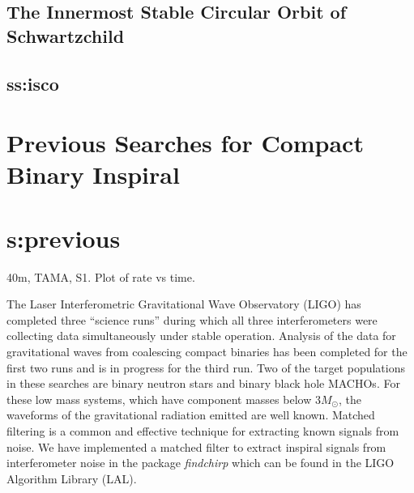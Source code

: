 \subsection{The Innermost Stable Circular Orbit of Schwartzchild}
\subsection{ss:isco}


\section{Previous Searches for Compact Binary Inspiral}
\section{s:previous}

40m, TAMA, S1. Plot of rate vs time.


The Laser Interferometric Gravitational Wave Observatory (LIGO)\cite{barish}
has completed three ``science runs'' during which all three interferometers
were collecting data simultaneously under stable operation. Analysis of the
data for gravitational waves from coalescing compact binaries has been
completed for the first two runs\cite{bns1,bns2,macho} and is in progress for
the third run. Two of the target populations in these searches are binary
neutron stars\cite{300yrs} and binary black hole
MACHOs\cite{sammacho,nakamura}. For these low mass systems, which have
component masses below $3 M_\odot$, the waveforms of the gravitational
radiation emitted are well known\cite{bdiww,biww}.  Matched filtering is a
common and effective technique for extracting known signals from
noise\cite{wz}. We have implemented a matched filter to extract inspiral
signals from interferometer noise in the package \emph{findchirp} which can be
found in the LIGO Algorithm Library (LAL)\cite{lal}.


